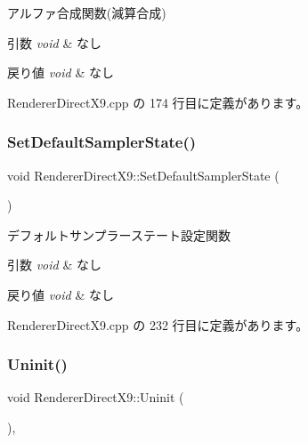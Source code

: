 アルファ合成関数(減算合成) 


\begin{DoxyParams}{引数}
{\em void} & なし \\
\hline
\end{DoxyParams}

\begin{DoxyRetVals}{戻り値}
{\em void} & なし \\
\hline
\end{DoxyRetVals}


 Renderer\+Direct\+X9.\+cpp の 174 行目に定義があります。

\mbox{\label{class_renderer_direct_x9_a229cd266427d96486c43d2e63300e438}} 
\subsubsection{\texorpdfstring{Set\+Default\+Sampler\+State()}{SetDefaultSamplerState()}}
{\footnotesize\ttfamily void Renderer\+Direct\+X9\+::\+Set\+Default\+Sampler\+State (\begin{DoxyParamCaption}{ }\end{DoxyParamCaption})}



デフォルトサンプラーステート設定関数 


\begin{DoxyParams}{引数}
{\em void} & なし \\
\hline
\end{DoxyParams}

\begin{DoxyRetVals}{戻り値}
{\em void} & なし \\
\hline
\end{DoxyRetVals}


 Renderer\+Direct\+X9.\+cpp の 232 行目に定義があります。

\mbox{\label{class_renderer_direct_x9_af7ff314cbaa894d71e37c10565002f8f}} 
\subsubsection{\texorpdfstring{Uninit()}{Uninit()}}
{\footnotesize\ttfamily void Renderer\+Direct\+X9\+::\+Uninit (\begin{DoxyParamCaption}{ }\end{DoxyParamCaption})\hspace{0.3cm}{\ttfamily [override]}, {\ttfamily [virtual]}}



